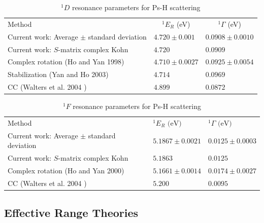 \documentclass[preprint,showpacs,showkeys,preprintnumbers,amsmath,amssymb,longbibliography,pra,aps]{revtex4-1}
\newcommand*{\thead}[1]{\multicolumn{1}{c}{#1}}
\begin{document}
\begin{table}[H]
\begin{center}
\begin{ruledtabular}
\begin{tabular}{l l l}
Method & \thead{$^1E_R$ (eV)} & \thead{$^1\Gamma$ (eV)} \\
\colrule
Current work: Average $\pm$ standard deviation & $4.720 \pm 0.001$ & $0.0908 \pm 0.0010$ \\
Current work: $S$-matrix complex Kohn & $4.720$ & $0.0909$ \\
Complex rotation (Ho and Yan 1998) \cite{Ho1998} & $4.710 \pm 0.0027$ & $0.0925 \pm 0.0054$  \\
Stabilization (Yan and Ho 2003) \cite{Yan2003} & $4.714$ & $0.0969$ \\
CC (Walters et al. 2004 \cite{Walters2004}) & $4.899$ & $0.0872$ \\
\end{tabular}
\end{ruledtabular}
\caption{$^1D$ resonance parameters for Ps-H scattering}
\label{tab:DWaveResonances}
\end{center}
\end{table}


\begin{table}[H]
\begin{center}
\begin{ruledtabular}
\begin{tabular}{l l l}
Method & $^1E_R \text{ (eV)}$ & $^1\Gamma \text{ (eV)}$ \\
\colrule
Current work: Average $\pm$ standard deviation & $5.1867 \pm 0.0021$ & $0.0125 \pm 0.0003$ \\
Current work: $S$-matrix complex Kohn & $5.1863$ & $0.0125$ \\
Complex rotation (Ho and Yan 2000) \cite{Ho2000} & $5.1661 \pm 0.0014$ & $0.0174 \pm 0.0027$  \\
CC (Walters et al. 2004 \cite{Walters2004}) & $5.200$ & $0.0095$ \\
\end{tabular}
\end{ruledtabular}
\caption{$^1F$ resonance parameters for Ps-H scattering}
\label{tab:FWaveResonances}
\end{center}
\end{table}


\subsection{Effective Range Theories}
\end{document}
